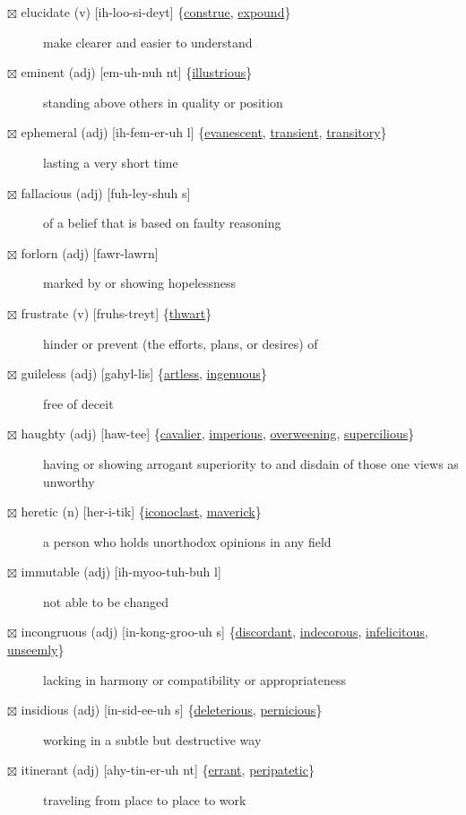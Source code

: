 \documentclass[11pt]{article}
\begin{document}
\begin{description}
\item[{$\boxtimes$ \label{orgedb44cd}elucidate (v) [ih-loo-si-deyt] \{\hyperref[orgb0dc1b1]{construe}, \hyperref[org6079d2d]{expound}\}}] make clearer and easier to understand
\item[{$\boxtimes$ \label{orga5ef3a2}eminent (adj) [em-uh-nuh nt] \{\hyperref[org0ad47af]{illustrious}\}}] standing above others in quality or position
\item[{$\boxtimes$ \label{org70165c8}ephemeral (adj) [ih-fem-er-uh l] \{\hyperref[orgf68fa16]{evanescent}, \hyperref[orgb67ac3b]{transient}, \hyperref[org51c6a20]{transitory}\}}] lasting a very short time
\item[{$\boxtimes$ fallacious (adj) [fuh-ley-shuh s]}] of a belief that is based on faulty reasoning
\item[{$\boxtimes$ \label{org4b3b315}forlorn (adj) [fawr-lawrn]}] marked by or showing hopelessness
\item[{$\boxtimes$ \label{orgf536104}frustrate (v) [fruhs-treyt] \{\hyperref[org7d329ca]{thwart}\}}] hinder or prevent (the efforts, plans, or desires) of
\item[{$\boxtimes$ \label{orgc2431f3}guileless (adj) [gahyl-lis] \{\hyperref[orgc958c7d]{artless}, \hyperref[org3f15685]{ingenuous}\}}] free of deceit
\item[{$\boxtimes$ \label{org7951d4f}haughty (adj) [haw-tee] \{\hyperref[org3d40184]{cavalier}, \hyperref[org21b1cf6]{imperious}, \hyperref[orgd0e4f1a]{overweening}, \hyperref[org457da96]{supercilious}\}}] having or showing arrogant superiority to and disdain of those one views as unworthy
\item[{$\boxtimes$ \label{orgac2067d} \label{orgfb725fd}heretic (n) [her-i-tik] \{\hyperref[org55ebaaa]{iconoclast}, \hyperref[org15e752e]{maverick}\}}] a person who holds unorthodox opinions in any field
\item[{$\boxtimes$ \label{orgb26e99f}immutable (adj) [ih-myoo-tuh-buh l]}] not able to be changed
\item[{$\boxtimes$ \label{org42977a6}incongruous (adj) [in-kong-groo-uh s] \{\hyperref[org829be41]{discordant}, \hyperref[org6f6aa07]{indecorous}, \hyperref[org04e38e0]{infelicitous}, \hyperref[org5b5b913]{unseemly}\}}] lacking in harmony or compatibility or appropriateness
\item[{$\boxtimes$ \label{orgdb9cb07}insidious (adj) [in-sid-ee-uh s] \{\hyperref[org91e2062]{deleterious}, \hyperref[org5e79379]{pernicious}\}}] working in a subtle but destructive way
\item[{$\boxtimes$ \label{orgab898fc}itinerant (adj) [ahy-tin-er-uh nt] \{\hyperref[orgcb7fea8]{errant}, \hyperref[org4d2fb07]{peripatetic}\}}] traveling from place to place to work

\end{description}
\end{document}
